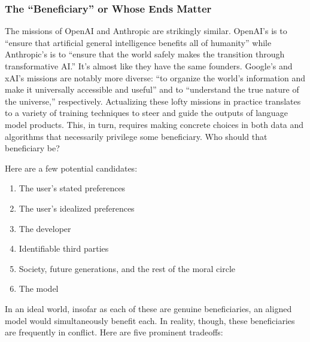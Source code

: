 \documentclass[letterpaper]{article} %
\begin{document}
\subsubsection{The ``Beneficiary'' or Whose Ends Matter}

The missions of OpenAI and Anthropic are strikingly similar. OpenAI's is to ``ensure that artificial general intelligence benefits all of humanity'' \citep{openai_about} while Anthropic's is to ``ensure that the world safely makes the transition through transformative AI.'' \citep{anthropic_constitution} It's almost like they have the same founders. Google's and xAI's missions are notably more diverse: ``to organize the world's information and make it universally accessible and useful'' \citep{google_companyinfo} and to ``understand the true nature of the universe,'' \citep{time_xai} respectively. Actualizing these lofty missions in practice translates to a variety of training techniques to steer and guide the outputs of language model products. This, in turn, requires making concrete choices in both data and algorithms that necessarily privilege some beneficiary. Who should that beneficiary be?

Here are a few potential candidates:

\begin{enumerate}
\def\labelenumi{\arabic{enumi}.}
\item
  The user's stated preferences
\item
  The user's idealized preferences
\item
  The developer
\item
  Identifiable third parties
\item
  Society, future generations, and the rest of the moral circle
\item
  The model
\end{enumerate}

In an ideal world, insofar as each of these are genuine beneficiaries, an aligned model would simultaneously benefit each. In reality, though, these beneficiaries are frequently in conflict. Here are five prominent tradeoffs:
\end{document}
